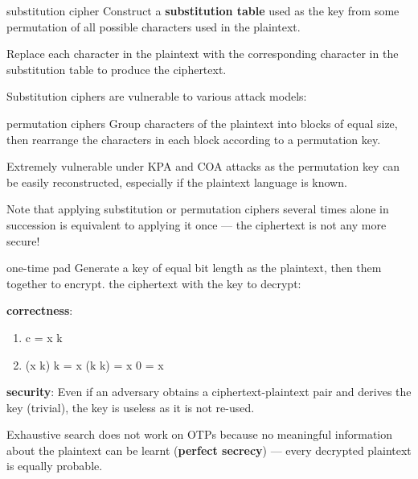 \begin{defn}{substitution cipher}
    Construct a \textbf{substitution table} used as the key from some permutation of all possible characters used in the plaintext.

    Replace each character in the plaintext with the corresponding character in the substitution table to produce the ciphertext.

    Substitution ciphers are vulnerable to various attack models:
    \begin{itemize}
    \end{itemize}
\end{defn}

\begin{defn}{permutation ciphers}
    Group characters of the plaintext into blocks of equal size, then rearrange the characters in each block according to a permutation key.

    Extremely vulnerable under KPA and COA attacks as the permutation key can be easily reconstructed, especially if the plaintext language is known.
\end{defn}

Note that applying substitution or permutation ciphers several times alone in succession is equivalent to applying it once --- the ciphertext is not any more secure!

\begin{defn}{one-time pad}
    Generate a key of equal bit length as the plaintext, then  them together to encrypt.  the ciphertext with the key to decrypt:

    \textbf{correctness}:
    \begin{enumerate}
        \item c = x  k
        \item (x  k)  k = x  (k  k) = x  0 = x
    \end{enumerate}

    \textbf{security}:
    Even if an adversary obtains a ciphertext-plaintext pair and derives the key (trivial), the key is useless as it is not re-used.
\end{defn}

Exhaustive search does not work on OTPs because no meaningful information about the plaintext can be learnt (\textbf{perfect secrecy}) --- every decrypted plaintext is equally probable.